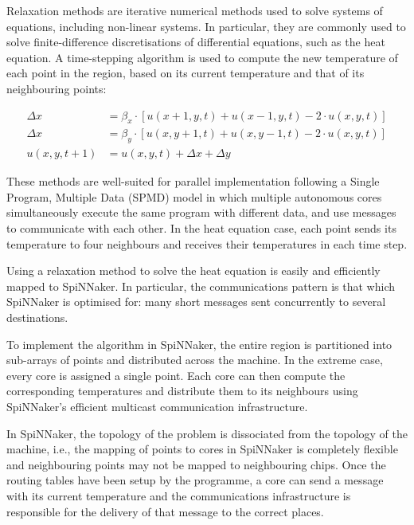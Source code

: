 \documentclass[a4paper, 11pt]{article}
\begin{document}
Relaxation methods are iterative numerical methods used to solve systems of equations, including non-linear systems. In particular, they are commonly used to solve finite-difference discretisations of differential equations, such as the heat equation. A time-stepping algorithm is used to compute the new temperature of each point in the region, based on its current temperature and that of its neighbouring points:

\begin{align*}
\Delta x   &= \beta_x \cdot [u(x+1,y,t) + u(x-1,y,t) - 2 \cdot u(x,y,t)] \\
\Delta x   &= \beta_y \cdot [u(x,y+1,t) + u(x,y-1,t) - 2 \cdot u(x,y,t)] \\
u(x,y,t+1) &= u(x,y,t) + \Delta x + \Delta y
\end{align*}


These methods are well-suited for parallel implementation following a Single Program, Multiple Data (SPMD) model in which multiple autonomous cores simultaneously execute the same program with different data, and use messages to communicate with each other. In the heat equation case, each point sends its temperature to four neighbours and receives their temperatures in each time step.

Using a relaxation method to solve the heat equation is easily and efficiently mapped to SpiNNaker. In particular, the communications pattern is that which SpiNNaker is optimised for: many short messages sent concurrently to several destinations.

To implement the algorithm in SpiNNaker, the entire region is partitioned into sub-arrays of points and distributed across the machine. In the extreme case, every core is assigned a single point. Each core can then compute the corresponding temperatures and distribute them to its neighbours using SpiNNaker's efficient multicast communication infrastructure.

In SpiNNaker, the topology of the problem is dissociated from the topology of the machine, i.e., the mapping of points to cores in SpiNNaker is completely flexible and neighbouring points may not be mapped to neighbouring chips. Once the routing tables have been setup by the programme, a core can send a message with its current temperature and the communications infrastructure is responsible for the delivery of that message to the correct places.
\end{document}
